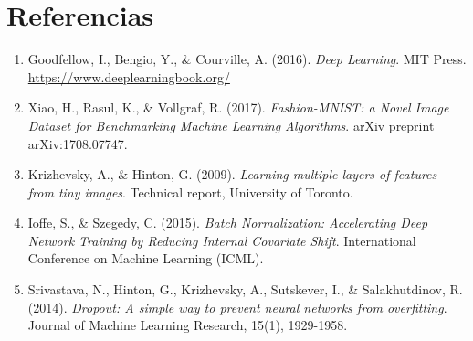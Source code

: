 \documentclass[12pt]{article}
\begin{document}
	\newpage
	\section{Referencias}
	\begin{enumerate}
		\item Goodfellow, I., Bengio, Y., \& Courville, A. (2016). \textit{Deep Learning}. MIT Press. \url{https://www.deeplearningbook.org/}
		\item Xiao, H., Rasul, K., \& Vollgraf, R. (2017). \textit{Fashion-MNIST: a Novel Image Dataset for Benchmarking Machine Learning Algorithms}. arXiv preprint arXiv:1708.07747.
		\item Krizhevsky, A., \& Hinton, G. (2009). \textit{Learning multiple layers of features from tiny images}. Technical report, University of Toronto.
		\item Ioffe, S., \& Szegedy, C. (2015). \textit{Batch Normalization: Accelerating Deep Network Training by Reducing Internal Covariate Shift}. International Conference on Machine Learning (ICML).
		\item Srivastava, N., Hinton, G., Krizhevsky, A., Sutskever, I., \& Salakhutdinov, R. (2014). \textit{Dropout: A simple way to prevent neural networks from overfitting}. Journal of Machine Learning Research, 15(1), 1929-1958.
	\end{enumerate}
	
\end{document}
